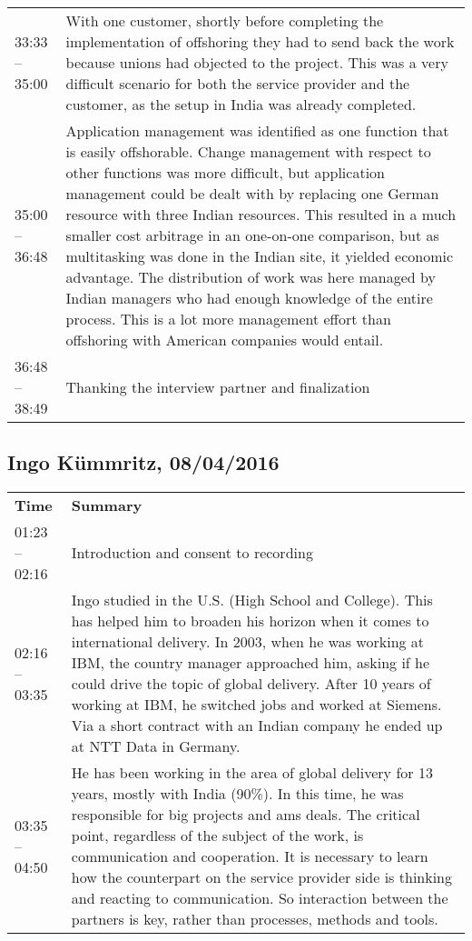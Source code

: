 \begin{appendix}
\begin{longtable}{l p{12.5cm}}
	33:33 -- 35:00 & With one customer, shortly before completing the implementation of offshoring they had to send back the work because unions had objected to the project. This was a very difficult scenario for both the service provider and the customer, as the setup in India was already completed.\\
	35:00 -- 36:48 & Application management was identified as one function that is easily offshorable. Change management with respect to other functions was more difficult, but application management could be dealt with by replacing one German resource with three Indian resources. This resulted in a much smaller cost arbitrage in an one-on-one comparison, but as multitasking was done in the Indian site, it yielded economic advantage. The distribution of work was here managed by Indian managers who had enough knowledge of the entire process. This is a lot more management effort than offshoring with American companies would entail.\\
	36:48 -- 38:49& Thanking the interview partner and finalization\\ 
\end{longtable}
\newpage
\tocless\subsection{Ingo Kümmritz, 08/04/2016}
\label{int:Ingo}
\begin{longtable}{l p{12.5cm}}
	\textbf{Time} & \textbf{Summary} \\ 
	01:23 -- 02:16 & Introduction and consent to recording\\
	02:16 -- 03:35 & Ingo studied in the U.S. (High School and College). This has helped him to broaden his horizon when it comes to international delivery. In 2003, when he was working at IBM, the country manager approached him, asking if he could drive the topic of global delivery. After 10 years of working at IBM, he switched jobs and worked at Siemens. Via a short contract with an Indian company he ended up at NTT \nolinebreak Data in Germany.\\
	03:35 -- 04:50&He has been working in the area of global delivery for 13 years, mostly with India (90\%). In this time, he was responsible for big projects and \gls{ams} deals. The critical point, regardless of the subject of the work, is communication and cooperation. It is necessary to learn how the counterpart on the service provider side is thinking and reacting to communication. So interaction between the partners is key, rather than processes, methods and tools.\\

\end{longtable}
\end{appendix}
